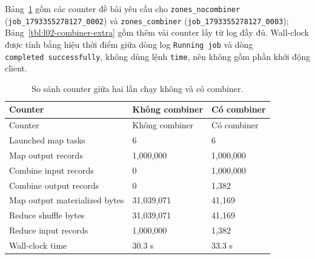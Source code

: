 \documentclass[
  12pt,
  a4paper,
]{report}
\newenvironment{Shaded}{}{}
\newcommand{\AttributeTok}[1]{\textcolor[rgb]{0.49,0.56,0.16}{#1}}
\newcommand{\DataTypeTok}[1]{\textcolor[rgb]{0.56,0.13,0.00}{#1}}
\newcommand{\ExtensionTok}[1]{#1}
\newcommand{\NormalTok}[1]{#1}
\newcommand{\StringTok}[1]{\textcolor[rgb]{0.25,0.44,0.63}{#1}}
\newcommand{\VariableTok}[1]{\textcolor[rgb]{0.10,0.09,0.49}{#1}}
\begin{document}
\begin{Shaded}
\end{Shaded}

Bảng~\ref{tbl:l02-combiner} gồm các counter đề bài yêu cầu cho
\texttt{zones\_}\allowbreak{}\texttt{nocombiner}\allowbreak{}
(\texttt{job\_}\allowbreak{}\texttt{1793355278127\_}\allowbreak{}\texttt{0002}\allowbreak{})
và \texttt{zones\_combiner}
(\texttt{job\_}\allowbreak{}\texttt{1793355278127\_}\allowbreak{}\texttt{0003}\allowbreak{});
Bảng~\ref{tbl:l02-combiner-extra} gồm thêm vài counter lấy từ log đầy
đủ. Wall-clock được tính bằng hiệu thời điểm giữa dòng log
\texttt{Running\ job} và dòng
\texttt{completed\ successfully}\allowbreak{}, không dùng lệnh
\texttt{time}, nên không gồm phần khởi động client.

\begin{longtable}[]{@{}lll@{}}
\caption{\label{tbl:l02-combiner}So sánh counter giữa hai lần chạy không
và có combiner.}\tabularnewline
\toprule\noalign{}
Counter & Không combiner & Có combiner \\
\midrule\noalign{}
\endfirsthead
\toprule\noalign{}
Counter & Không combiner & Có combiner \\
\midrule\noalign{}
\endhead
\bottomrule\noalign{}
\endlastfoot
Launched map tasks & 6 & 6 \\
Map output records & 1,000,000 & 1,000,000 \\
Combine input records & 0 & 1,000,000 \\
Combine output records & 0 & 1,382 \\
Map output materialized bytes & 31,039,071 & 41,169 \\
Reduce shuffle bytes & 31,039,071 & 41,169 \\
Reduce input records & 1,000,000 & 1,382 \\
Wall-clock time & 30.3 s & 33.3 s \\
\end{longtable}
\end{document}
